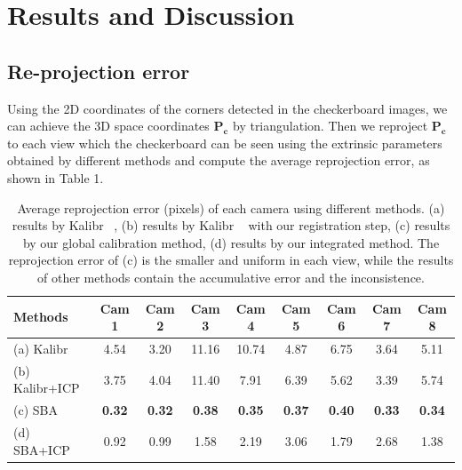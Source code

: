  
\section{Results and Discussion}
\label{sec:Results}



\subsection{Re-projection error}


Using the 2D coordinates of the corners detected in the checkerboard images, we can achieve the 3D space coordinates $\mathbf{P_{c}}$ by triangulation. Then we reproject $\mathbf{P_{c}}$ to each view which the checkerboard can be seen using the extrinsic parameters obtained by different methods and compute the average reprojection error, as shown in Table 1.
\begin{table}
	\centering
	\caption{Average reprojection error (pixels) of each camera using different methods. (a) results by Kalibr ~\cite{Maye2013Self}, (b) results by Kalibr ~\cite{Maye2013Self} with our registration step, (c) results by our global calibration method, (d) results by our integrated method. The reprojection error of (c) is the smaller and uniform in each view, while the results of other methods contain the accumulative error and the inconsistence. }
	\label{tab:reprojection}
	\begin{tabular}{lcccccccc}
		\hline
		Methods & Cam 1 & Cam 2 & Cam 3 & Cam 4 & Cam 5 & Cam 6 & Cam 7 & Cam 8\\
		\hline
		(a) Kalibr &4.54 &3.20 &11.16 &10.74 &4.87 &6.75 &3.64 &5.11\\

		(b) Kalibr+ICP &3.75 &4.04 &11.40 &7.91 &6.39 &5.62 &3.39 &5.74\\
		
		(c) SBA 　 &\textbf{0.32} &\textbf{0.32} &\textbf{0.38}  &\textbf{0.35} &\textbf{0.37} &\textbf{0.40} &\textbf{0.33} &\textbf{0.34} \\
		
		(d) SBA+ICP &0.92 &0.99 &1.58 &2.19 &3.06 &1.79 &2.68 &1.38\\
		\hline
		
	\end{tabular}


\end{table}


